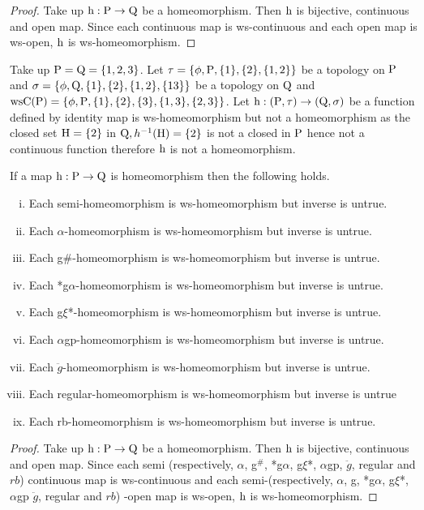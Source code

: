 \begin{proof}
Take up $\mathrm{h}: \mathrm{P}\to \mathrm{Q}$ be a homeomorphism. Then $\mathrm{h}$ is bijective, continuous and open map. Since each continuous map is ws-continuous and each open map is ws-open, $\mathrm{h}$ is ws-homeomorphism.
\end{proof}

\begin{exm}\label{exam5.2.2}
Take up $\mathrm{P}=\mathrm{Q}= \{1, 2, 3\}$. Let $\tau= \{\phi, \TSP, \{1\}, \{2\},\break \{1,2\}\}$ be a topology on $\mathrm{P}$  and $\sigma=\{\phi, \mathrm{Q}, \{1\}, \{2\}, \{1, 2\}, \{1 3\}\}$ be a topology on $\mathrm{Q}$ and $\mathrm{ws}\mathrm{C}(\mathrm{P})= \{\phi, \mathrm{P}, \{1\}, \{2\},\{3\}, \{1,3\},\{2, 3\}\}$. Let $\mathrm{h}: (\mathrm{P}, \tau )\to (\mathrm{Q}, \sigma)$ be a function defined by identity map is ws-homeomorphism but not a homeomorphism as the closed set $\mathrm{H}=\{2\}$ in $\mathrm{Q}, h^{-1} (\mathrm{H})=\{2\}$ is not a closed in $\mathrm{P}$ hence not a continuous function therefore $\mathrm{h}$ is not a homeomorphism.
\end{exm}

\begin{thm}\label{thm5.2.2}
If a map $\mathrm{h}: \mathrm{P}\to \mathrm{Q}$ is homeomorphism then the following holds.
\begin{enumerate}[(i)]
\item Each semi-homeomorphism is ws-homeomorphism but inverse is untrue.
\item Each $\alpha$-homeomorphism is ws-homeomorphism but inverse is untrue.
\item Each g\#-homeomorphism is ws-homeomorphism but inverse is untrue.
\item Each *g$\alpha$-homeomorphism is ws-homeomorphism but inverse is untrue.
\item Each g$\xi$*-homeomorphism is ws-homeomorphism but inverse is untrue.
\item Each $\alpha$gp-homeomorphism is ws-homeomorphism but inverse is untrue.
\item Each $\ddot{g}$-homeomorphism is ws-homeomorphism but inverse is untrue.
\item Each regular-homeomorphism is ws-homeomorphism but inverse is untrue
\item Each rb-homeomorphism is ws-homeomorphism but inverse is untrue.
\end{enumerate}
\end{thm}

\begin{proof}
Take up $\mathrm{h}: \mathrm{P}\to \mathrm{Q}$ be a homeomorphism. Then $\mathrm{h}$ is bijective, continuous and open map. Since each semi (respectively, $\alpha$, g$^{\text{\#}}$, *g$\alpha$, g$\xi$*, $\alpha$gp, $\ddot{g}$, regular and $rb$) continuous map is ws-continuous and each semi-(respectively, $\alpha$, g, *g$\alpha$, g$\xi$*, $\alpha$gp $\ddot{g}$, regular and $rb$) -open map is ws-open, $\mathrm{h}$ is ws-homeomorphism.
\end{proof}

